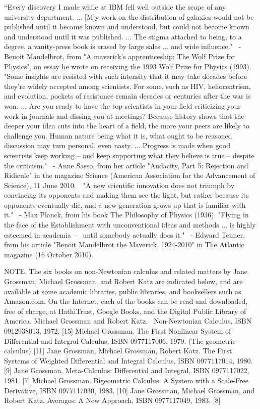 \documentclass[12pt]{article}
\begin{document}
“Every discovery I made while at IBM fell well outside the scope of any university department. ... [M]y work on the distribution of galaxies would not be published until it became known and understood, but could not become known and understood until it was published. ... The stigma attached to being, to a degree, a vanity-press book is erased by large sales ... and wide influence."  - Benoit Mandelbrot, from "A maverick's apprenticeship: The Wolf Prize for Physics", an essay he wrote on receiving the 1993 Wolf Prize for Physics (1993).
"Some insights are resisted with such intensity that it may take decades before they're widely accepted among scientists. For some, such as HIV, heliocentrism, and evolution, pockets of resistance remain decades or centuries after the war is won. ... Are you ready to have the top scientists in your field criticizing your work in journals and dissing you at meetings? Because history shows that the deeper your idea cuts into the heart of a field, the more your peers are likely to challenge you. Human nature being what it is, what ought to be reasoned discussion may turn personal, even nasty. ... Progress is made when good scientists keep working -- and keep supporting what they believe is true -- despite the criticism."  - Anne Sasso, from her article "Audacity, Part 5: Rejection and Ridicule" in the magazine Science (American Association for the Advancement of Science), 11 June 2010.   "A new scientific innovation does not triumph by convincing its opponents and making them see the light, but rather because its opponents eventually die, and a new generation grows up that is familiar with it."  - Max Planck, from his book The Philosophy of Physics (1936).
"Flying in the face of the Establishment with unconventional ideas and methods ... is highly esteemed in academia --  until somebody actually does it."  - Edward Tenner, from his article "Benoit Mandelbrot the Maverick, 1924-2010" in The Atlantic magazine (16 October 2010).

NOTE. The six books on non-Newtonian calculus and related matters by Jane Grossman, Michael Grossman, and Robert Katz are indicated below, and are available at some academic libraries, public libraries, and booksellers such as Amazon.com. On the Internet, each of the books can be read and downloaded, free of charge, at HathiTrust, Google Books, and the Digital Public Library of America.
Michael Grossman and Robert Katz.  Non-Newtonian Calculus, ISBN 0912938013, 1972. [15] 
Michael Grossman. The First Nonlinear System of Differential and Integral Calculus, ISBN 0977117006, 1979. (The geometric calculus) [11] 
Jane Grossman, Michael Grossman, Robert Katz. The First Systems of Weighted Differential and Integral Calculus, ISBN 0977117014, 1980. [9]
Jane Grossman. Meta-Calculus: Differential and Integral, ISBN 0977117022, 1981. [7]
Michael Grossman. Bigeometric Calculus: A System with a Scale-Free Derivative, ISBN 0977117030, 1983. [10]
Jane Grossman, Michael Grossman, and Robert Katz. Averages: A New Approach, ISBN 0977117049, 1983. [8]
\end{document}
